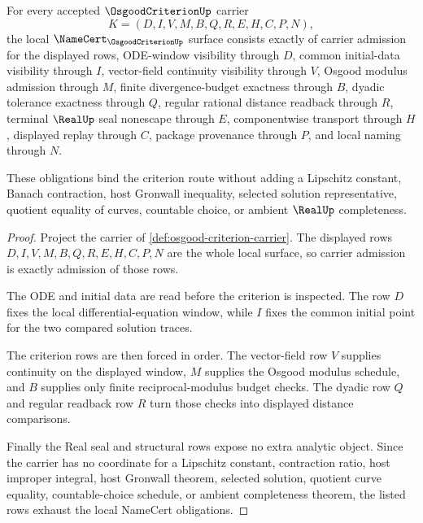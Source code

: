 \begin{theorem}
\label{thm:osgood-criterion-namecert-obligations}
For every accepted $\OsgoodCriterionUp$ carrier
$$
K=(D,I,V,M,B,Q,R,E,H,C,P,N),
$$
the local $\NameCert_{\OsgoodCriterionUp}$ surface consists exactly of carrier admission for the displayed rows, ODE-window visibility through $D$, common initial-data visibility through $I$, vector-field continuity visibility through $V$, Osgood modulus admission through $M$, finite divergence-budget exactness through $B$, dyadic tolerance exactness through $Q$, regular rational distance readback through $R$, terminal $\RealUp$ seal nonescape through $E$, componentwise transport through $H$, displayed replay through $C$, package provenance through $P$, and local naming through $N$.

These obligations bind the criterion route without adding a Lipschitz constant, Banach contraction, host Gronwall inequality, selected solution representative, quotient equality of curves, countable choice, or ambient $\RealUp$ completeness.
\end{theorem}
\begin{proof}
Project the carrier of \autoref{def:osgood-criterion-carrier}. The displayed rows $D,I,V,M,B,Q,R,E,H,C,P,N$ are the whole local surface, so carrier admission is exactly admission of those rows.

The ODE and initial data are read before the criterion is inspected. The row $D$ fixes the local differential-equation window, while $I$ fixes the common initial point for the two compared solution traces.

The criterion rows are then forced in order. The vector-field row $V$ supplies continuity on the displayed window, $M$ supplies the Osgood modulus schedule, and $B$ supplies only finite reciprocal-modulus budget checks. The dyadic row $Q$ and regular readback row $R$ turn those checks into displayed distance comparisons.

Finally the Real seal and structural rows expose no extra analytic object. Since the carrier has no coordinate for a Lipschitz constant, contraction ratio, host improper integral, host Gronwall theorem, selected solution, quotient curve equality, countable-choice schedule, or ambient completeness theorem, the listed rows exhaust the local NameCert obligations.
\end{proof}

